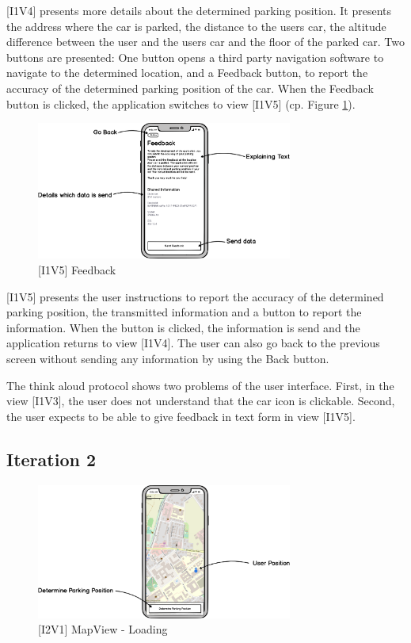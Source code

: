 [I1V4] presents more details about the determined parking position. It presents the address where the car is parked, the distance to the users car, the altitude difference between the user and the users car and the floor of the parked car. Two buttons are presented: One button opens a third party navigation software to navigate to the determined location, and a Feedback button, to report the accuracy of the determined parking position of the car. When the Feedback button is clicked, the application switches to view [I1V5] (cp. Figure \ref{fig:i1v5}).

\begin{figure}[H]
    \centering
    \includegraphics[width=0.75\textwidth]{images/UI/[I1V5]Feedback.png}
    \caption{[I1V5] Feedback}
    \label{fig:i1v5}
\end{figure}

[I1V5] presents the user instructions to report the accuracy of the determined parking position, the transmitted information and a button to report the information. When the button is clicked, the information is send and the application returns to view [I1V4]. The user can also go back to the previous screen without sending any information by using the Back button.


The think aloud protocol shows two problems of the user interface. First, in the view [I1V3], the user does not understand that the car icon is clickable. Second, the user expects to be able to give feedback in text form in view [I1V5].

\subsection{Iteration 2}

\begin{figure}[H]
    \centering
    \includegraphics[width=0.75\textwidth]{images/UI/[I2V1]MapView-Loading.png}
    \caption{[I2V1] MapView - Loading}
    \label{fig:i2v1}
\end{figure}

